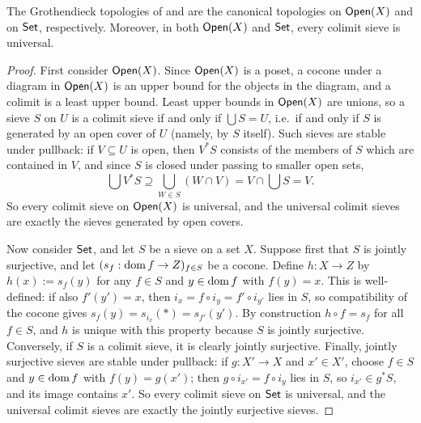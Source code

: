\begin{proposition}\label{prop:chap:sheaves:sec:sites:examples are canonical}
    The Grothendieck topologies of  and  are the canonical topologies on $\mathsf{Open}(X)$ and on $\mathsf{Set}$, respectively. Moreover, in both $\mathsf{Open}(X)$ and $\mathsf{Set}$, every colimit sieve is universal.
\end{proposition}
\begin{proof}
    First consider $\mathsf{Open}(X)$. Since $\mathsf{Open}(X)$ is a poset, a cocone under a diagram in $\mathsf{Open}(X)$ is an upper bound for the objects in the diagram, and a colimit is a least upper bound. Least upper bounds in $\mathsf{Open}(X)$ are unions, so a sieve $S$ on $U$ is a colimit sieve if and only if $\bigcup S = U$, i.e.\ if and only if $S$ is generated by an open cover of $U$ (namely, by $S$ itself). Such sieves are stable under pullback: if $V \subseteq U$ is open, then $V^* S$ consists of the members of $S$ which are contained in $V$, and since $S$ is closed under passing to smaller open sets,
    \[\bigcup V^* S \supseteq \bigcup_{W \in S} (W \cap V) = V \cap \bigcup S = V.\]
    So every colimit sieve on $\mathsf{Open}(X)$ is universal, and the universal colimit sieves are exactly the sieves generated by open covers.

    Now consider $\mathsf{Set}$, and let $S$ be a sieve on a set $X$. Suppose first that $S$ is jointly surjective, and let $(s_f : \operatorname{dom} f \to Z)_{f \in S}$ be a cocone. Define $h : X \to Z$ by $h(x) := s_f(y)$ for any $f \in S$ and $y \in \operatorname{dom} f$ with $f(y) = x$. This is well-defined: if also $f'(y') = x$, then $i_x = f \circ i_y = f' \circ i_{y'}$ lies in $S$, so compatibility of the cocone gives $s_f(y) = s_{i_x}(\ast) = s_{f'}(y')$. By construction $h \circ f = s_f$ for all $f \in S$, and $h$ is unique with this property because $S$ is jointly surjective. Conversely, if $S$ is a colimit sieve, it is clearly jointly surjective. Finally, jointly surjective sieves are stable under pullback: if $g : X' \to X$ and $x' \in X'$, choose $f \in S$ and $y \in \operatorname{dom} f$ with $f(y) = g(x')$; then $g \circ i_{x'} = f \circ i_{y}$ lies in $S$, so $i_{x'} \in g^* S$, and its image contains $x'$. So every colimit sieve on $\mathsf{Set}$ is universal, and the universal colimit sieves are exactly the jointly surjective sieves.
\end{proof}


